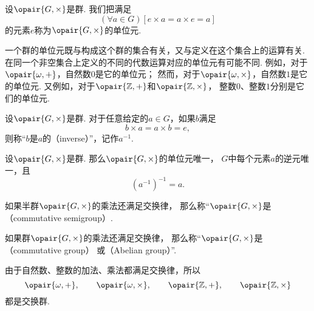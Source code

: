 \begin{definition}
设\(\opair{G,\times}\)是群.
我们把满足\[
    (\forall a \in G)
    [e \times a = a \times e = a]
\]的元素\(e\)称为\(\opair{G,\times}\)的单位元.
\end{definition}

一个群的单位元既与构成这个群的集合有关，又与定义在这个集合上的运算有关.
在同一个非空集合上定义的不同的代数运算对应的单位元有可能不同.
例如，对于\(\opair{\omega,+}\)，自然数\(0\)是它的单位元；
然而，对于\(\opair{\omega,\times}\)，自然数\(1\)是它的单位元.
又例如，对于\(\opair{\mathbb{Z},+}\)和\(\opair{\mathbb{Z},\times}\)，
整数\(0\)、整数\(1\)分别是它们的单位元.

\begin{definition}
设\(\opair{G,\times}\)是群.
对于任意给定的\(a \in G\)，如果\(b\)满足\[
    b \times a = a \times b = e,
\]
则称“\(b\)是\(a\)的（inverse）”，记作\(a^{-1}\).
\end{definition}

\begin{property}
设\(\opair{G,\times}\)是群.
那么\(\opair{G,\times}\)的单位元唯一，
\(G\)中每个元素\(a\)的逆元唯一，且\[
    (a^{-1})^{-1} = a.
\]
\end{property}

\begin{definition}
如果半群\(\opair{G,\times}\)的乘法还满足交换律，
那么称“\(\opair{G,\times}\)是（commutative semigroup）.
\end{definition}

\begin{definition}
如果群\(\opair{G,\times}\)的乘法还满足交换律，
那么称“\(\opair{G,\times}\)是（commutative group）%
或（Abelian group）”.
\end{definition}

由于自然数、整数的加法、乘法都满足交换律，所以\[
	\opair{\omega,+}, \qquad
	\opair{\omega,\times}, \qquad
	\opair{\mathbb{Z},+}, \qquad
	\opair{\mathbb{Z},\times}
\]都是交换群.
